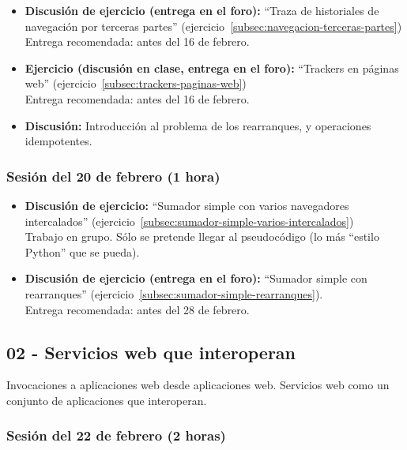 \documentclass[a4paper,12pt]{article}
\begin{document}
\begin{itemize}
\item \textbf{Discusión de ejercicio (entrega en el foro):} ``Traza de historiales de navegación por terceras partes'' (ejercicio~\ref{subsec:navegacion-terceras-partes})  \\
  Entrega recomendada: antes del 16 de febrero.
\item \textbf{Ejercicio (discusión en clase, entrega en el foro):} ``Trackers en páginas web'' (ejercicio~\ref{subsec:trackers-paginas-web})  \\
  Entrega recomendada: antes del 16 de febrero.
\item \textbf{Discusión:} Introducción al problema de los rearranques, y operaciones idempotentes.
\end{itemize}

\subsubsection{Sesión del 20 de febrero (1 hora)}

\begin{itemize}
\item \textbf{Discusión de ejercicio:} ``Sumador simple con varios 
navegadores intercalados'' (ejercicio~\ref{subsec:sumador-simple-varios-intercalados}) \\
  Trabajo en grupo. Sólo se pretende llegar al pseudocódigo (lo más ``estilo Python'' que se pueda).
\item \textbf{Discusión de ejercicio (entrega en el foro):} ``Sumador simple con rearranques'' (ejercicio~\ref{subsec:sumador-simple-rearranques}). \\
 Entrega recomendada: antes del 28 de febrero.
\end{itemize}

\subsection{02 - Servicios web que interoperan}


Invocaciones a aplicaciones web desde aplicaciones web. Servicios web como un conjunto de aplicaciones que interoperan.

\subsubsection{Sesión del 22 de febrero (2 horas)}
\end{document}
